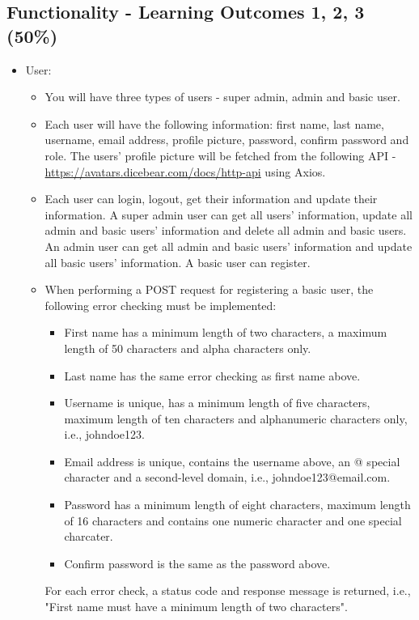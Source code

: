 \documentclass{article}
\begin{document}
\subsection*{Functionality - Learning Outcomes 1, 2, 3 (50\%)}
\begin{itemize}
	\item User:
	\begin{itemize}
		\item You will have three types of users - super admin, admin and basic user.
		\item Each user will have the following information: first name, last name, username, email address, profile picture, password, confirm password and role. The users' profile picture will be fetched from the following API - \href{https://avatars.dicebear.com/docs/http-api}{https://avatars.dicebear.com/docs/http-api} using Axios. 
		\item Each user can login, logout, get their information and update their information. A super admin user can get all users' information, update all admin and basic users' information and delete all admin and basic users. An admin user can get all admin and basic users' information and update all basic users' information. A basic user can register.
		\item When performing a POST request for registering a basic user, the following error checking must be implemented:
		\begin{itemize}
			\item First name has a minimum length of two characters, a maximum length of 50 characters and alpha characters only.
			\item Last name has the same error checking as first name above.
			\item Username is unique, has a minimum length of five characters, maximum length of ten characters and alphanumeric characters only, i.e., johndoe123.
			\item Email address is unique, contains the username above, an @ special character and a second-level domain, i.e., johndoe123@email.com.
			\item Password has a minimum length of eight characters, maximum length of 16 characters and contains one numeric character and one special charcater.
			\item Confirm password is the same as the password above.
		\end{itemize}
		For each error check, a status code and response message is returned, i.e., "First name must have a minimum length of two characters".

\end{itemize}
\end{itemize}
\end{document}
